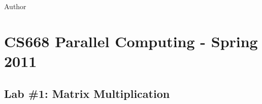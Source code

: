 \documentclass[11pt,oneside]{article}
\title{\mytitle \\ \mysubtitle}
\author{\myauthor}
\def\myauthor{Author}
\def\mycopyright{\myauthor}
\begin{document}

\maketitle

\textcopyright{} \mycopyright

%
%


\setlength{\parindent}{1em}

\section{CS668 Parallel Computing - Spring 2011}
\label{cs668parallelcomputing-spring2011}

\subsection{Lab \#1: Matrix Multiplication}
\label{lab1:matrixmultiplication}
\end{document}
